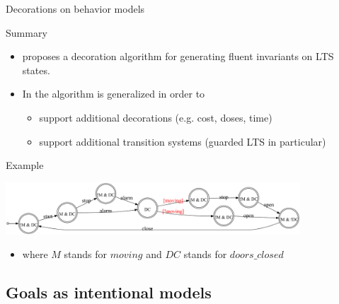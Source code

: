 \documentclass[11pt]{beamer}
\begin{document}
\begin{frame}{Decorations on behavior models}
	\begin{block}{Summary}
		\begin{itemize}
			\item \cite{Damas05} proposes a decoration algorithm for generating fluent invariants on LTS states.
			\item In \cite{Damas10} the algorithm is generalized in order to 
				\begin{itemize}
					\item support additional decorations (e.g. cost, doses, time)
					\item support additional transition systems (guarded LTS in particular)
				\end{itemize}
		\end{itemize}
	\end{block}	
	\begin{block}{Example}
		\begin{center} 
			\includegraphics[width=11cm]{images/Train_guarded_LTS_decorated.pdf}
		\end{center}
		\vspace{-0.5cm}
		\begin{itemize}
			\item where $M$ stands for $moving$ and $DC$ stands for $doors\_closed$
		\end{itemize}
	\end{block}
\end{frame}

\subsection{Goals as intentional models}
\end{document}
